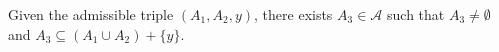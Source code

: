Given the admissible triple $(A_1, A_2, y)$, there exists $A_3 \in \mathcal{A}$ such that $A_3 \neq \emptyset$ and $A_3 \subseteq (A_1 \cup A_2) + \{y\}$.
